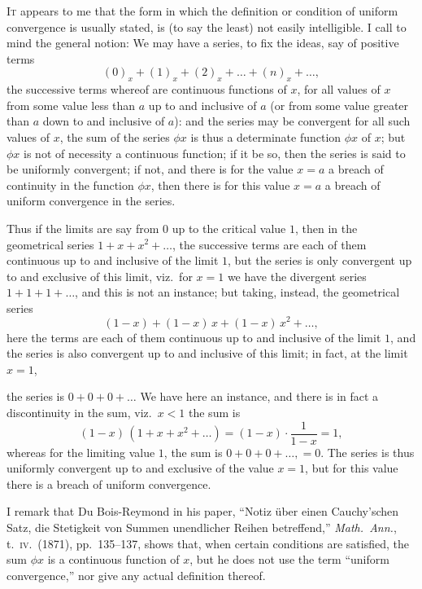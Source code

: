 \documentclass[11pt]{article}
\begin{document}
\textsc{It} appears to me that the form in which the definition or condition of uniform convergence is usually stated, is (to say the least) not easily intelligible. I call to mind the general notion: We may have a series, to fix the ideas, say of positive terms
\[
(0)_x + (1)_x + (2)_x + \ldots + (n)_x + \ldots,
\]
the successive terms whereof are continuous functions of $x$, for all values of $x$ from some value less than $a$ up to and inclusive of $a$ (or from some value greater than $a$ down to and inclusive of $a$): and the series may be convergent for all such values of $x$, the sum of the series $\phi x$ is thus a determinate function $\phi x$ of $x$; but $\phi x$ is not of necessity a continuous function; if it be so, then the series is said to be uniformly convergent; if not, and there is for the value $x = a$ a breach of continuity in the function $\phi x$, then there is for this value $x = a$ a breach of uniform convergence in the series.

Thus if the limits are say from $0$ up to the critical value $1$, then in the geometrical series $1 + x + x^2 + \ldots$, the successive terms are each of them continuous up to and inclusive of the limit $1$, but the series is only convergent up to and exclusive of this limit, viz.\ for $x = 1$ we have the divergent series $1 + 1 + 1 + \ldots$, and this is not an instance; but taking, instead, the geometrical series
\[
(1 - x) + (1 - x)\, x + (1 - x)\, x^2 + \ldots,
\]
here the terms are each of them continuous up to and inclusive of the limit $1$, and the series is also convergent up to and inclusive of this limit; in fact, at the limit $x = 1$,

the series is $0 + 0 + 0 + \ldots$ We have here an instance, and there is in fact a discontinuity in the sum, viz.\ $x < 1$ the sum is
\[
(1 - x)\,(1 + x + x^2 + \ldots) = (1 - x)\cdot\frac{1}{1 - x} = 1,
\]
whereas for the limiting value $1$, the sum is $0 + 0 + 0 + \ldots, = 0$. The series is thus uniformly convergent up to and exclusive of the value $x = 1$, but for this value there is a breach of uniform convergence.

I remark that Du Bois-Reymond in his paper, ``Notiz \"uber einen Cauchy'schen Satz, die Stetigkeit von Summen unendlicher Reihen betreffend,'' \textit{Math.\ Ann.}, t.\ \textsc{iv}.\ (1871), pp.\ 135--137, shows that, when certain conditions are satisfied, the sum $\phi x$ is a continuous function of $x$, but he does not use the term ``uniform convergence,'' nor give any actual definition thereof.
\end{document}
